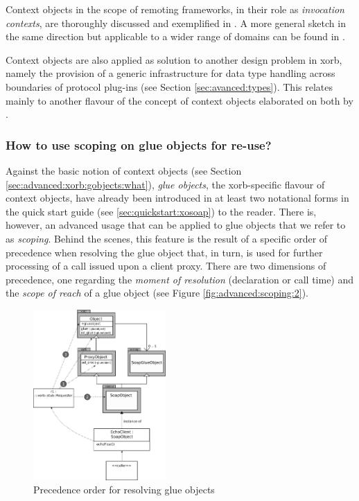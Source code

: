 Context objects in the scope of remoting frameworks, in their role as \emph{invocation contexts}, are thoroughly discussed and exemplified in \cite{zdun:2005}. A more general sketch in the same direction but applicable to a wider range of domains can be found in \cite{kelly:2003}.

Context objects are also applied as solution to another design problem in xorb, namely the provision of a generic infrastructure for data type handling across boundaries of protocol plug-ins (see Section \ref{sec:avanced:types}). This relates mainly to another flavour of the concept of context objects elaborated on both by \cite{maetzel:1996,sommerlad:1998}. 
  
  \subsubsection{How to use scoping on glue objects for re-use?}\label{sec:advanced:xorb:gobjects:why}
  Against the basic notion of context objects (see Section \ref{sec:advanced:xorb:gobjects:what}), \emph{glue objects}, the xorb-specific flavour of context objects, have already been introduced in at least two notational forms in the quick start guide (see \ref{sec:quickstart:xosoap}) to the reader. There is, however, an advanced usage that can be applied to glue objects that we refer to as \emph{scoping}. Behind the scenes, this feature is the result of a specific order of precedence when resolving the glue object that, in turn, is used for further processing of a call issued upon a client proxy. There are two dimensions of precedence, one regarding the \emph{moment of resolution} (declaration or call time) and the \emph{scope of reach} of a glue object (see Figure \ref{fig:advanced:scoping:2}).
  \begin{figure}[htbp]
\begin{center}
\includegraphics[width=0.45\textwidth]{img/scoping-glue-objects-structure.png}
\caption{Precedence order for resolving glue objects}
\label{fig:advanced:scoping:1}
\end{center}
\end{figure}

